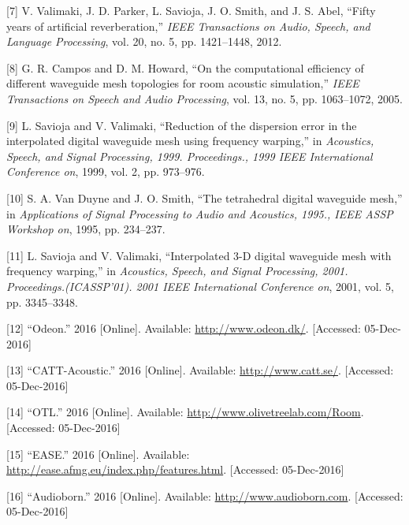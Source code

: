 \documentclass[]{scrreprt}
\begin{document}
\hypertarget{ref-valimakiux5ffiftyux5f2012}{}
{[}7{]} V. Valimaki, J. D. Parker, L. Savioja, J. O. Smith, and J. S.
Abel, ``Fifty years of artificial reverberation,'' \emph{IEEE
Transactions on Audio, Speech, and Language Processing}, vol. 20, no. 5,
pp. 1421--1448, 2012.

\hypertarget{ref-camposux5fcomputationalux5f2005}{}
{[}8{]} G. R. Campos and D. M. Howard, ``On the computational efficiency
of different waveguide mesh topologies for room acoustic simulation,''
\emph{IEEE Transactions on Speech and Audio Processing}, vol. 13, no. 5,
pp. 1063--1072, 2005.

\hypertarget{ref-saviojaux5freductionux5f1999}{}
{[}9{]} L. Savioja and V. Valimaki, ``Reduction of the dispersion error
in the interpolated digital waveguide mesh using frequency warping,'' in
\emph{Acoustics, Speech, and Signal Processing, 1999. Proceedings., 1999
IEEE International Conference on}, 1999, vol. 2, pp. 973--976.

\hypertarget{ref-vanux5fduyneux5ftetrahedralux5f1995}{}
{[}10{]} S. A. Van Duyne and J. O. Smith, ``The tetrahedral digital
waveguide mesh,'' in \emph{Applications of Signal Processing to Audio
and Acoustics, 1995., IEEE ASSP Workshop on}, 1995, pp. 234--237.

\hypertarget{ref-saviojaux5finterpolatedux5f2001}{}
{[}11{]} L. Savioja and V. Valimaki, ``Interpolated 3-D digital
waveguide mesh with frequency warping,'' in \emph{Acoustics, Speech, and
Signal Processing, 2001. Proceedings.(ICASSP'01). 2001 IEEE
International Conference on}, 2001, vol. 5, pp. 3345--3348.

\hypertarget{ref-ux5fodeonux5f2016}{}
{[}12{]} ``Odeon.'' 2016 {[}Online{]}. Available:
\url{http://www.odeon.dk/}. {[}Accessed: 05-Dec-2016{]}

\hypertarget{ref-ux5fcatt-acousticux5f2016}{}
{[}13{]} ``CATT-Acoustic.'' 2016 {[}Online{]}. Available:
\url{http://www.catt.se/}. {[}Accessed: 05-Dec-2016{]}

\hypertarget{ref-ux5fotlux5f2016}{}
{[}14{]} ``OTL.'' 2016 {[}Online{]}. Available:
\url{http://www.olivetreelab.com/Room}. {[}Accessed: 05-Dec-2016{]}

\hypertarget{ref-ux5feaseux5f2016}{}
{[}15{]} ``EASE.'' 2016 {[}Online{]}. Available:
\url{http://ease.afmg.eu/index.php/features.html}. {[}Accessed:
05-Dec-2016{]}

\hypertarget{ref-ux5faudiobornux5f2016}{}
{[}16{]} ``Audioborn.'' 2016 {[}Online{]}. Available:
\url{http://www.audioborn.com}. {[}Accessed: 05-Dec-2016{]}
\end{document}

